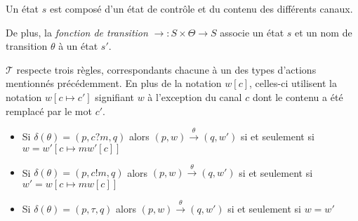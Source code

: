 Un état $s$ est composé d'un état de contrôle et du contenu des différents canaux.

De plus, la \emph{fonction de transition} $\rightarrow:S\times\Theta\rightarrow S$ associe un état $s$ et un nom de transition $\theta$ à un état $s'$.

$\mathcal{T}$ respecte trois règles, correspondants chacune à un des types d'actions mentionnés précédemment. En plus de la notation $w[c]$, celles-ci utilisent la notation $w[c\mapsto c']$ signifiant $w$ à l'exception du canal $c$ dont le contenu a été remplacé par le mot $c'$.
\begin{itemize}
  \item Si $\delta(\theta)=(p,c?m,q)$ alors $(p,w)\xrightarrow{\theta}(q,w')$ si et seulement si $w=w'[c\mapsto mw'[c]]$
  \item Si $\delta(\theta)=(p,c!m,q)$ alors $(p,w)\xrightarrow{\theta}(q,w')$ si et seulement si $w'=w[c\mapsto mw[c]]$
  \item Si $\delta(\theta)=(p,\tau,q)$ alors $(p,w)\xrightarrow{\theta}(q,w')$ si et seulement si $w=w'$
\end{itemize}




